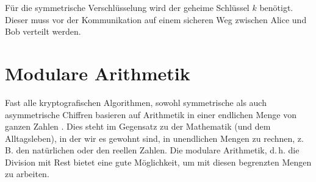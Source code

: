 \noindent
Für die symmetrische Verschlüsselung wird der geheime Schlüssel $k$ benötigt. Dieser
muss vor der Kommunikation auf einem sicheren Weg zwischen Alice und Bob verteilt werden.

\section{Modulare Arithmetik}
Fast alle kryptografischen Algorithmen, sowohl symmetrische als auch asymmetrische Chiffren
basieren auf Arithmetik in einer endlichen Menge von ganzen Zahlen \parencite[13]{BOOK:crypto}.
Dies steht im Gegensatz zu der Mathematik (und dem Alltagsleben),
in der wir es gewohnt sind, in unendlichen
Mengen zu rechnen, z.\,B. den natürlichen oder den reellen Zahlen. Die modulare Arithmetik,
d.\,h. die Division mit Rest bietet eine gute Möglichkeit, um mit diesen begrenzten Mengen
zu arbeiten.


